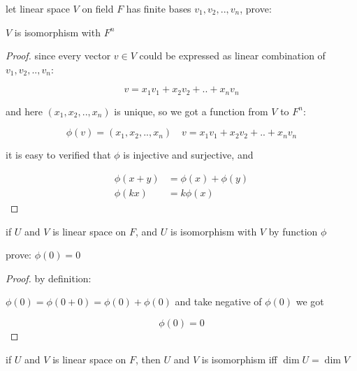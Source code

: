 \begin{exercise}
    let linear space $V$ on field $F$ has finite bases $v_1,v_2,..,v_n$, prove:
    
    $V$ is isomorphism with $F^n$
\end{exercise}

\begin{proof}
    since every vector $v \in V$ could be expressed as linear combination of $v_1,v_2, ..,v_n$:

    \[
        v= x_1v_1 + x_2v_2 + .. + x_nv_n
    \]

    and here $(x_1,x_2,..,x_n)$ is unique, so we got a function from $V$ to $F^n$:

    \[
        \phi(v) = (x_1,x_2, .., x_n)\quad
        v= x_1v_1 + x_2v_2 + .. + x_nv_n
    \]

    it is easy to verified that $\phi$ is injective and surjective, and

    \begin{align*}
        \phi(x+y) &= \phi(x) + \phi(y) \\
        \phi(kx) &= k \phi(x)
    \end{align*}
\end{proof}

\begin{exercise}
    if $U$ and $V$ is linear space on $F$, and $U$ is isomorphism with $V$ by function $\phi$

    prove: $\phi(0) = 0$
\end{exercise}

\begin{proof}
    by definition:
    
    $\phi(0) = \phi(0+0) = \phi(0) + \phi(0)$ and take negative of $\phi(0)$ we got

    \[
        \phi(0) = 0
    \]
\end{proof}

\begin{exercise}
    if $U$ and $V$ is linear space on $F$, then $U$ and $V$ is isomorphism iff $\dim U = \dim V$
\end{exercise}

